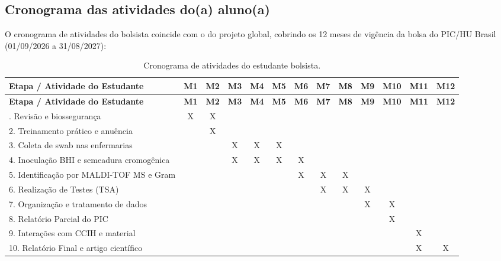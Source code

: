 \documentclass[12pt,a4paper]{article}
\begin{document}
\subsection{Cronograma das atividades do(a) aluno(a)}
O cronograma de atividades do bolsista coincide com o do projeto global, cobrindo os 12 meses de vigência da bolsa do PIC/HU Brasil (01/09/2026 a 31/08/2027):

\begin{spacing}{1.0}
\begin{longtable}{lcccccccccccc}
\caption{Cronograma de atividades do estudante bolsista.}\\
\toprule
\textbf{Etapa / Atividade do Estudante} & \textbf{M1} & \textbf{M2} & \textbf{M3} & \textbf{M4} & \textbf{M5} & \textbf{M6} & \textbf{M7} & \textbf{M8} & \textbf{M9} & \textbf{M10} & \textbf{M11} & \textbf{M12} \\
\midrule
\endfirsthead
\toprule
\textbf{Etapa / Atividade do Estudante} & \textbf{M1} & \textbf{M2} & \textbf{M3} & \textbf{M4} & \textbf{M5} & \textbf{M6} & \textbf{M7} & \textbf{M8} & \textbf{M9} & \textbf{M10} & \textbf{M11} & \textbf{M12} \\
\midrule
\endhead
\bottomrule
\endfoot
1. Revisão e biossegurança & X & X & & & & & & & & & & \\
2. Treinamento prático e anuência & & X & & & & & & & & & & \\
3. Coleta de swab nas enfermarias & & & X & X & X & & & & & & & \\
4. Inoculação BHI e semeadura cromogênica & & & X & X & X & X & & & & & & \\
5. Identificação por MALDI-TOF MS e Gram & & & & & & X & X & X & & & & \\
6. Realização de Testes (TSA) & & & & & & & X & X & X & & & \\
7. Organização e tratamento de dados & & & & & & & & & X & X & & \\
8. Relatório Parcial do PIC & & & & & & & & & & X & & \\
9. Interações com CCIH e material & & & & & & & & & & & X & \\
10. Relatório Final e artigo científico & & & & & & & & & & & X & X \\
\bottomrule
\end{longtable}
\end{spacing}
\newpage

\end{document}
